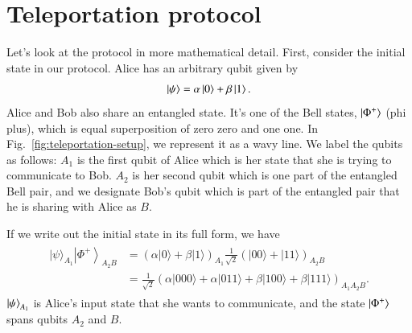 \section{Teleportation protocol}


Let's look at the protocol in more mathematical detail.  First, consider the initial state in our protocol. Alice has an arbitrary qubit given by
\begin{align}
    \left| \psi \right\rangle = \alpha\left| 0 \right\rangle + \beta\left| 1 \right\rangle.
\end{align}
Alice and Bob also share an entangled state. It's one of the Bell states, $\left| \Phi^+ \right\rangle$ (phi plus), which is equal superposition of zero zero and one one. In Fig.~\ref{fig:teleportation-setup}, we represent it as a wavy line. We label the qubits as follows: $A_1$ is the first qubit of Alice which is her state that she is trying to communicate to Bob. $A_2$ is her second qubit which is one part of the entangled Bell pair, and we designate Bob's qubit which is part of the entangled pair that he is sharing with Alice as $B$.

If we write out the initial state in its full form, we have
\begin{align}
    \begin{aligned}
|\psi\rangle_{A_{1}}\left|\Phi^{+}\right\rangle_{A_{2} B} &=(\alpha|0\rangle+\beta|1\rangle)_{A_{1}} \frac{1}{\sqrt{2}}(|00\rangle+|11\rangle)_{A_{2} B} \\
&=\frac{1}{\sqrt{2}}(\alpha|000\rangle+\alpha|011\rangle+\beta|100\rangle+\beta|111\rangle)_{A_{1} A_{2} B}.
\end{aligned}
\end{align}
$\left| \psi \right\rangle_{A_1}$ is Alice's input state that she wants to communicate, and the state $\left| \Phi^+ \right\rangle$ spans qubits $A_2$ and $B$.

